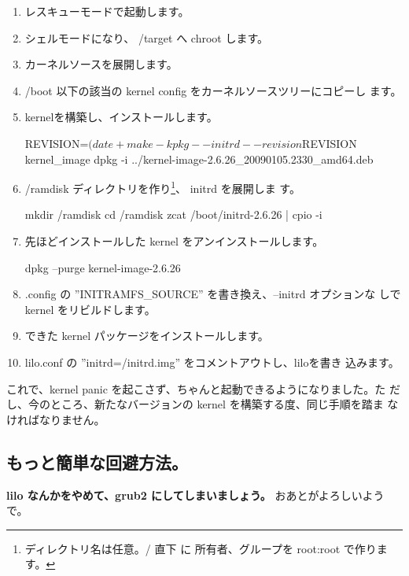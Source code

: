 \documentclass[mingoth,a4paper]{jsarticle}
\begin{document}
\begin{enumerate}
\item レスキューモードで起動します。
\item シェルモードになり、 /target へ chroot します。
\item カーネルソースを展開します。
\item /boot 以下の該当の kernel config をカーネルソースツリーにコピーし
      ます。
\item kernelを構築し、インストールします。
\begin{commandline}
REVISION=$(date +%
make-kpkg --initrd --revision $REVISION kernel_image
dpkg -i ../kernel-image-2.6.26_20090105.2330_amd64.deb
\end{commandline}

\item /ramdisk ディレクトリを作り\footnote{ディレクトリ名は任意。/ 直下
      に 所有者、グループを root:root で作ります。}、 initrd を展開しま
      す。
\begin{commandline}
mkdir /ramdisk
cd /ramdisk
zcat /boot/initrd-2.6.26 | cpio -i
\end{commandline}

\item 先ほどインストールした kernel をアンインストールします。
\begin{commandline}
dpkg --purge kernel-image-2.6.26
\end{commandline}

\item .config の ''INITRAMFS\_SOURCE'' を書き換え、--initrd オプションな
      しで kernel をリビルドします。

\item できた kernel パッケージをインストールします。
\item lilo.conf の ''initrd=/initrd.img'' をコメントアウトし、liloを書き
      込みます。

\end{enumerate}

これで、kernel panic を起こさず、ちゃんと起動できるようになりました。た
だし、今のところ、新たなバージョンの kernel を構築する度、同じ手順を踏ま
なければなりません。


\subsection{もっと簡単な回避方法。}
\textbf{ lilo なんかをやめて、grub2 にしてしまいましょう。}
おあとがよろしいようで。
\end{document}
